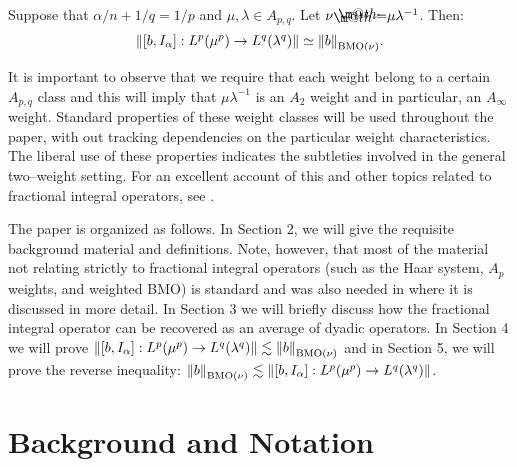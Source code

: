 \documentclass[12pt]{amsart}
\begin{document}
\begin{thm} \label{T:mainThm}
Suppose that $\alpha/n+1/q=1/p$ and $\mu, {\lambda} \in A_{p,q}$. Let $\nu {\mathrel{\rlap{                     \raisebox{0.3ex}{$\m@th\cdot$}}                     \raisebox{-0.3ex}{$\m@th\cdot$}}                     =} \mu{\lambda}^{-1}$. 
Then:
\begin{align*}
{\ensuremath{\left\|{[b,I_{\alpha}]:L^p(\mu^p)\to L^q({\lambda}^q)}\right\|}}
\simeq 
{\ensuremath{\left\|{b}\right\|}}_{{\textnormal{BMO}}(\nu)}.
\end{align*}
\end{thm}

It is important to observe that we require that each weight
belong to a certain $A_{p,q}$ class and this will imply that
$\mu\lambda^{-1}$ is an $A_2$ weight and in particular, 
an $A_\infty$ weight. Standard properties of these weight
classes will be used throughout the paper, with out tracking
dependencies on the particular weight characteristics. The 
liberal use of these properties indicates the subtleties 
involved in the general two--weight setting. For an excellent 
account of this and other topics related to fractional integral 
operators, see \cite{Cru2015}.

The paper is organized as follows. In Section 2, we will give the
requisite background material and definitions. Note, however,  that most of the material not relating strictly to fractional integral operators 
(such as the Haar system, $A_p$ weights, and weighted BMO) is standard and
was also needed in \cite{HolLacWic2015b} where it is discussed in more detail.
In Section 3 we will briefly discuss how the fractional integral
operator can be recovered as an average of dyadic operators.
In Section 4 we 
will prove ${\ensuremath{\left\|{[b,I_{\alpha}]:L^p(\mu^p)\to L^q({\lambda}^q)}\right\|}}
\lesssim {\ensuremath{\left\|{b}\right\|}}_{{\textnormal{BMO}}(\nu)}$ and in Section 5, we will 
prove the reverse inequality: ${\ensuremath{\left\|{b}\right\|}}_{{\textnormal{BMO}}(\nu)}
\lesssim {\ensuremath{\left\|{[b,I_{\alpha}]:L^p(\mu^p)\to L^q({\lambda}^q)}\right\|}}$.

\section{Background and Notation} 
\end{document}
